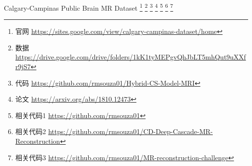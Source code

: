 

Calgary-Campinas Public Brain MR Dataset
\footnote{官网 \textcolor{blue}{\url{https://sites.google.com/view/calgary-campinas-dataset/home}}}
\footnote{数据 \textcolor{blue}{\url{https://drive.google.com/drive/folders/1kK1tyMEPgvQhJbLT5mhQut9uXXfr9jS7}}}
\footnote{代码 \textcolor{blue}{\url{https://github.com/rmsouza01/Hybrid-CS-Model-MRI}}}
\footnote{论文 \textcolor{blue}{\url{https://arxiv.org/abs/1810.12473}}}
\footnote{相关代码1 \textcolor{blue}{\url{https://github.com/rmsouza01}}}
\footnote{相关代码2 \textcolor{blue}{\url{https://github.com/rmsouza01/CD-Deep-Cascade-MR-Reconstruction}}}
\footnote{相关代码3 \textcolor{blue}{\url{https://github.com/rmsouza01/MR-reconstruction-challenge}}}


